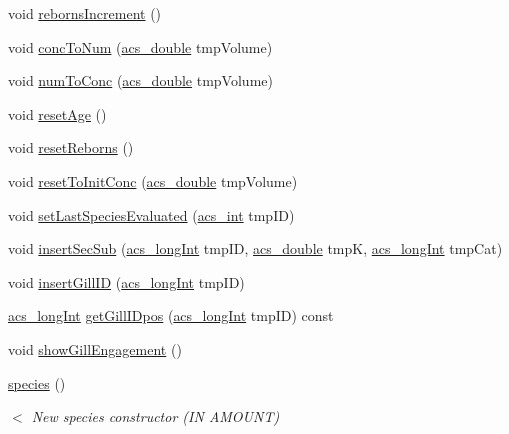 \begin{DoxyCompactItemize}
\item 
void \hyperlink{a00021_a90d5fc1d90637f2245e8b0ecf228ddfa}{reborns\+Increment} ()
\item 
void \hyperlink{a00021_a9842732a5dbe0eb67e24148b5d7ae4a2}{conc\+To\+Num} (\hyperlink{a00050_ab776853a005fcbf56af0424a2a4dd607}{acs\+\_\+double} tmp\+Volume)
\item 
void \hyperlink{a00021_a23c19a53390142ba690d0f3db0520d05}{num\+To\+Conc} (\hyperlink{a00050_ab776853a005fcbf56af0424a2a4dd607}{acs\+\_\+double} tmp\+Volume)
\item 
void \hyperlink{a00021_a911d4db36e84690d19abb2902a734524}{reset\+Age} ()
\item 
void \hyperlink{a00021_a4884d8bce59ddb79e87e08f3ed16633f}{reset\+Reborns} ()
\item 
void \hyperlink{a00021_acc180a103e6681da2add266aafda3eb9}{reset\+To\+Init\+Conc} (\hyperlink{a00050_ab776853a005fcbf56af0424a2a4dd607}{acs\+\_\+double} tmp\+Volume)
\item 
void \hyperlink{a00021_a8daa007da55f042b9c436f956836f4d8}{set\+Last\+Species\+Evaluated} (\hyperlink{a00050_a8d277355641a098190360234e2ebde35}{acs\+\_\+int} tmp\+I\+D)
\item 
void \hyperlink{a00021_a0da8d53a216583f7790b12362da376a3}{insert\+Sec\+Sub} (\hyperlink{a00050_a19319d75f02db4308bc5c0026d98cd85}{acs\+\_\+long\+Int} tmp\+I\+D, \hyperlink{a00050_ab776853a005fcbf56af0424a2a4dd607}{acs\+\_\+double} tmp\+K, \hyperlink{a00050_a19319d75f02db4308bc5c0026d98cd85}{acs\+\_\+long\+Int} tmp\+Cat)
\item 
void \hyperlink{a00021_aeca516fc712a2bfa19ec560961ed03f7}{insert\+Gill\+I\+D} (\hyperlink{a00050_a19319d75f02db4308bc5c0026d98cd85}{acs\+\_\+long\+Int} tmp\+I\+D)
\item 
\hyperlink{a00050_a19319d75f02db4308bc5c0026d98cd85}{acs\+\_\+long\+Int} \hyperlink{a00021_a1a5c93a3fd5a2605d5e2fd14d29b97cd}{get\+Gill\+I\+Dpos} (\hyperlink{a00050_a19319d75f02db4308bc5c0026d98cd85}{acs\+\_\+long\+Int} tmp\+I\+D) const 
\item 
void \hyperlink{a00021_a211914e1702d47eb3203730fec2c7b4c}{show\+Gill\+Engagement} ()
\item 
\hyperlink{a00021_a25887c42dfb4b6f33a2d17fdcf74bc47}{species} ()
\begin{DoxyCompactList}\small\item\em $<$ New species constructor (I\+N A\+M\+O\+U\+N\+T) \end{DoxyCompactList}\item 

\end{DoxyCompactItemize}
